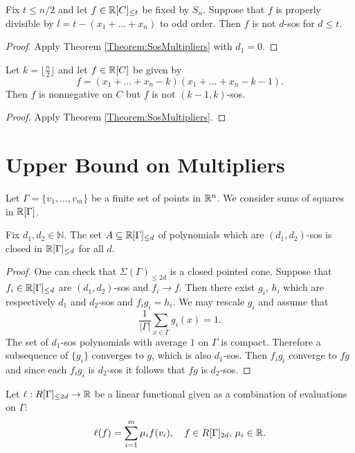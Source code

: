 \begin{corollary}  \label{Corollary:Sos}
Fix $t \leq n/2$ and let $f \in \mathbb{R}[C]_{\leq t}$ be fixed by $S_n$. Suppose that $f$ is properly divisible by $l=t-(x_1+\dots+x_n)$ to odd order. Then $f$ is not $d$-sos for $d \le t$.
\end{corollary}
\begin{proof}
Apply Theorem \ref{Theorem:SosMultipliers} with $d_1=0$.
\end{proof}

\begin{corollary}\label{Corollary:Quadratic}
Let $k=\lfloor \frac{n}{2}\rfloor$ and let $f\in \mathbb{R}[C]$ be given by $$f=(x_1+\dots+x_n-k)(x_1+\dots+x_n-k-1).$$
Then $f$ is nonnegative on $C$ but $f$ is not $(k-1,k)$-sos.
\end{corollary}
\begin{proof}
Apply Theorem \ref{Theorem:SosMultipliers}.
\end{proof}

\section{Upper Bound on Multipliers}\label{Section:UpperBound}

Let $\Gamma=\{v_1,\ldots,v_m\}$ be a finite set of points in $\mathbb{R}^n$. We consider sums of squares in $\mathbb{R}[\Gamma]$.

\begin{lemma} \label{Lemma:GenClosed}
Fix $d_1,d_2\in \mathbb{N}$. The set $A \subseteq \mathbb{R}[\Gamma]_{\leq d}$ of polynomials which are $(d_1,d_2)$-sos is closed in $\mathbb{R}[\Gamma]_{\leq d}$ for all $d$.
\end{lemma}
\begin{proof}
One can check that $\Sigma(\Gamma)_{\leq 2d}$ is a closed pointed cone.
Suppose that $f_i \in \mathbb{R}[\Gamma]_{\leq d}$ are $(d_1,d_2)$-sos and $f_i \rightarrow f$. Then there exist $g_i$, $h_i$ which are respectively $d_1$ and $d_2$-sos and $f_ig_i=h_i$. We may rescale $g_i$ and assume that $$\frac{1}{|\Gamma|}\sum_{x \in \Gamma} g_i(x)=1.$$
The set of $d_1$-sos polynomials with average $1$ on $\Gamma$ is compact. Therefore a subsequence of $\{g_i\}$ converges to $g$, which is also $d_1$-sos. Then $f_ig_i$ converge to $fg$ and since each $f_ig_i$ is $d_2$-sos it follows that $fg$ is $d_2$-sos. 

\end{proof}

Let $\ell: R[\Gamma]_{\leq 2d} \rightarrow \mathbb{R}$ be a linear functional given as a combination of evaluations on $\Gamma$:
$$\ell(f)=\sum_{i=1}^m \mu_if(v_i),\quad f \in R[\Gamma]_{2d}, \, \mu_i \in \mathbb{R}.$$

